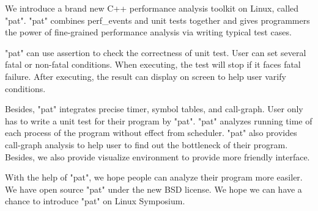 We introduce a brand new C++ performance analysis toolkit on Linux, called "pat".
"pat" combines perf_events and unit tests together and gives programmers the power of fine-grained performance analysis via writing typical test cases.

"pat" can use assertion to check the correctness of unit test. 
User can set several fatal or non-fatal conditions.
When executing, the test will stop if it faces fatal failure.
After executing, the result can display on screen to help user varify conditions.

Besides, "pat" integrates precise timer, symbol tables, and call-graph. 
User only has to write a unit test for their program by "pat". 
"pat" analyzes running time of each process of the program without effect from scheduler. 
"pat" also provides call-graph analysis to help user to find out the bottleneck of their program. 
Besides, we also provide visualize environment to provide more friendly interface.

With the help of "pat", we hope people can analyze their program more easiler.
We have open source "pat" under the new BSD license. 
We hope we can have a chance to introduce "pat" on Linux Symposium.